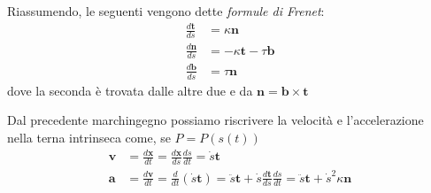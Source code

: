 Riassumendo, le seguenti vengono dette \emph{formule di Frenet}:
\begin{align*}
    \frac{d\mathbf{t} }{ds} &= \kappa \mathbf{n}  \\
    \frac{d\mathbf{n} }{ds} &= -\kappa \mathbf{t}  - \tau \mathbf{b}  \\
    \frac{d\mathbf{b} }{ds} &= \tau \mathbf{n}
\end{align*}
dove la seconda è trovata dalle altre due e da \(\mathbf{n} = \mathbf{b} \times
\mathbf{t} \) 

Dal precedente marchingegno possiamo riscrivere la velocità e l'accelerazione
nella terna intrinseca come, se \(P = P{(s{(t)})}\) 
\begin{align}\label{eq:velocita_accelerazione}
    \mathbf{v}  &= \frac{d\mathbf{x} }{dt} = \frac{d\mathbf{x} }{ds}
    \frac{ds}{dt} = \dot{s} \mathbf{t}\\
    \mathbf{a} &= \frac{d\mathbf{v} }{dt} = \frac{d}{dt} (\dot{s} \mathbf{t}) =
    \ddot{s} \mathbf{t} + \dot{s} \frac{d\mathbf{t} }{ds} \frac{ds}{dt} =
    \ddot{s} \mathbf{t} + \dot{s}^2 \kappa \mathbf{n}
\end{align}

